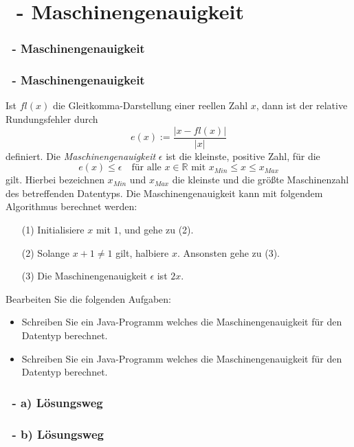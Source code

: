 \def\stitle{\theexercise\ - Maschinengenauigkeit}
\section{\stitle}
\begin{frame}
  \frametitle{\stitle}%
\tableofcontents[current]
\end{frame}


\begin{frame}[t]%
    \frametitle{\stitle}

Ist $fl(x)$ die Gleitkomma-Darstellung einer reellen Zahl $x$, dann ist der relative Rundungsfehler durch \[ e(x) := \frac{\lvert x - fl(x) \rvert }{\lvert x \rvert}  \] definiert.
Die \emph{Maschinengenauigkeit} $\epsilon$ ist die kleinste, positive Zahl, für die \[ e(x) \leq \epsilon \quad\text{für alle } x \in \mathbb{R} \text{ mit } x_{Min} \leq x \leq x_{Max} \] gilt.
Hierbei bezeichnen $x_{Min}$ und $x_{Max}$ die kleinste und die größte Maschinenzahl des betreffenden Datentyps.
Die Maschinengenauigkeit kann mit folgendem Algorithmus berechnet werden:
\begin{enumerate}
\item[(1)] Initialisiere $x$ mit $1$, und gehe zu (2).
\item[(2)] Solange $x + 1 \neq 1$ gilt, halbiere $x$. Ansonsten gehe zu (3).
\item[(3)] Die Maschinengenauigkeit $\epsilon$ ist $2x$.
\end{enumerate}

Bearbeiten Sie die folgenden Aufgaben:
\begin{itemize}
\item Schreiben Sie ein Java-Programm welches die Maschinengenauigkeit für den Datentyp  berechnet.
\item Schreiben Sie ein Java-Programm welches die Maschinengenauigkeit für den Datentyp  berechnet.
\end{itemize}

\end{frame}

\begin{frame}[fragile]%
 \frametitle{\theexercise\ - a) L\"osungsweg}%

\begin{center}

\end{center}
\end{frame}

\begin{frame}[fragile]%
 \frametitle{\theexercise\ - b) L\"osungsweg}%

\begin{center}

\end{center}
\end{frame}
